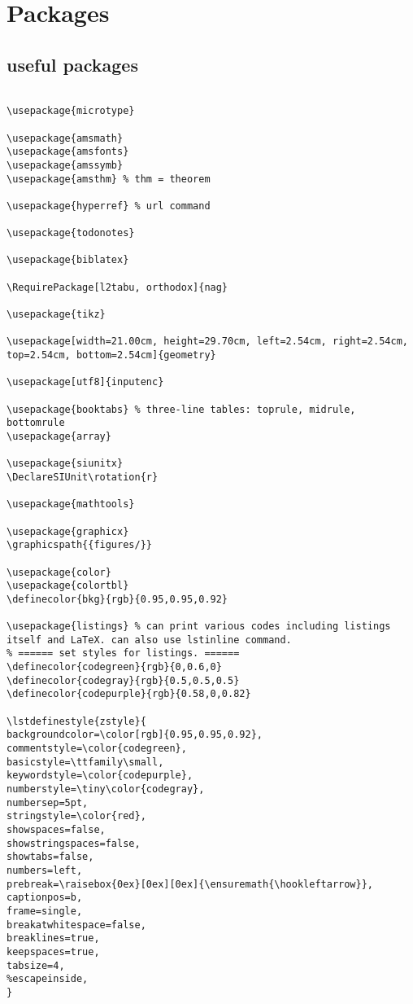 
\chapter{Packages}

\section{useful packages}
\begin{lstlisting}[language={[LaTex]Tex}]
% !Mode:: "TeX:UTF-8"	% read in as utf8 file.

\usepackage{microtype}

\usepackage{amsmath}
\usepackage{amsfonts}
\usepackage{amssymb}
\usepackage{amsthm}	% thm = theorem

\usepackage{hyperref} % url command

\usepackage{todonotes}

\usepackage{biblatex}

\RequirePackage[l2tabu, orthodox]{nag}

\usepackage{tikz}

\usepackage[width=21.00cm, height=29.70cm, left=2.54cm, right=2.54cm, top=2.54cm, bottom=2.54cm]{geometry}

\usepackage[utf8]{inputenc}

\usepackage{booktabs} % three-line tables: toprule, midrule, bottomrule
\usepackage{array}

\usepackage{siunitx}
\DeclareSIUnit\rotation{r}

\usepackage{mathtools}

\usepackage{graphicx}
\graphicspath{{figures/}}

\usepackage{color}
\usepackage{colortbl}
\definecolor{bkg}{rgb}{0.95,0.95,0.92}

\usepackage{listings} % can print various codes including listings itself and LaTeX. can also use lstinline command.
% ====== set styles for listings. ======
\definecolor{codegreen}{rgb}{0,0.6,0}
\definecolor{codegray}{rgb}{0.5,0.5,0.5}
\definecolor{codepurple}{rgb}{0.58,0,0.82}

\lstdefinestyle{zstyle}{
backgroundcolor=\color[rgb]{0.95,0.95,0.92},
commentstyle=\color{codegreen},
basicstyle=\ttfamily\small,
keywordstyle=\color{codepurple},
numberstyle=\tiny\color{codegray},
numbersep=5pt,
stringstyle=\color{red},
showspaces=false,
showstringspaces=false,
showtabs=false,
numbers=left,
prebreak=\raisebox{0ex}[0ex][0ex]{\ensuremath{\hookleftarrow}},
captionpos=b,
frame=single,
breakatwhitespace=false,
breaklines=true,
keepspaces=true,
tabsize=4,
%escapeinside,
}


\end{lstlisting}
